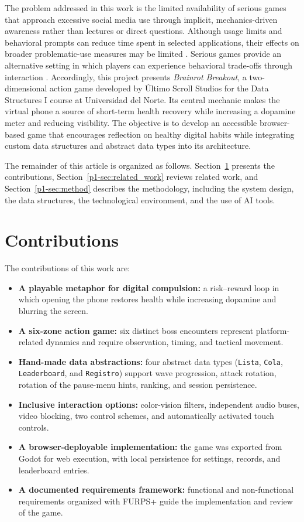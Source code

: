 \documentclass[conference]{IEEEtran}
\begin{document}
The problem addressed in this work is the limited availability of serious games that approach excessive social media use through implicit, mechanics-driven awareness rather than lectures or direct questions. Although usage limits and behavioral prompts can reduce time spent in selected applications, their effects on broader problematic-use measures may be limited \cite{mertens2026}. Serious games provide an alternative setting in which players can experience behavioral trade-offs through interaction \cite{andrew2023}. Accordingly, this project presents \emph{Brainrot Breakout}, a two-dimensional action game developed by Último Scroll Studios for the Data Structures I course at Universidad del Norte. Its central mechanic makes the virtual phone a source of short-term health recovery while increasing a dopamine meter and reducing visibility. The objective is to develop an accessible browser-based game that encourages reflection on healthy digital habits while integrating custom data structures and abstract data types into its architecture.

The remainder of this article is organized as follows. Section~\ref{p1-sec:contrib} presents the contributions, Section~\ref{p1-sec:related_work} reviews related work,
and Section~\ref{p1-sec:method} describes the methodology, including the system design, the data structures, the technological environment, and the use of AI tools.


\section{Contributions}
\label{p1-sec:contrib}

The contributions of this work are:
\begin{itemize}
\item \textbf{A playable metaphor for digital compulsion:} a risk--reward loop in which opening the phone restores health while increasing dopamine and blurring the screen.
\item \textbf{A six-zone action game:} six distinct boss encounters represent platform-related dynamics and require observation, timing, and tactical movement.
\item \textbf{Hand-made data abstractions:} four abstract data types (\texttt{Lista}, \texttt{Cola}, \texttt{Leaderboard}, and \texttt{Registro}) support wave progression, attack rotation, rotation of the pause-menu hints, ranking, and session persistence.
\item \textbf{Inclusive interaction options:} color-vision filters, independent audio buses, video blocking, two control schemes, and automatically activated touch controls.
\item \textbf{A browser-deployable implementation:} the game was exported from Godot for web execution, with local persistence for settings, records, and leaderboard entries.
\item \textbf{A documented requirements framework:} functional and non-functional requirements organized with FURPS+ guide the implementation and review of the game.
\end{itemize}
\end{document}
